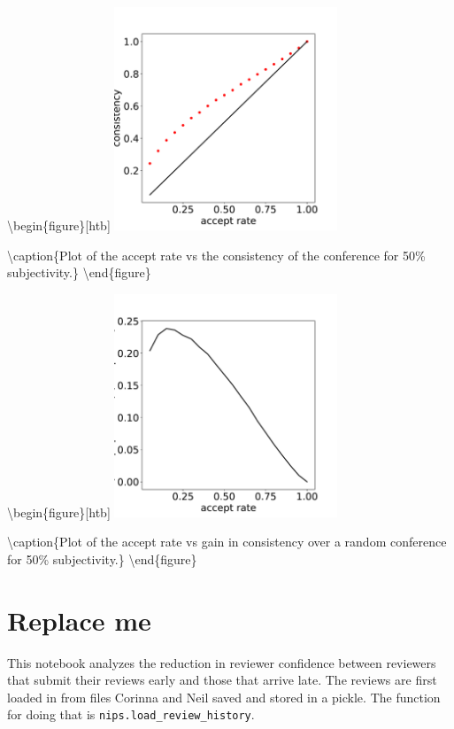 \textbackslash begin\{figure\}{[}htb{]}
\includegraphics[width=0.50\textwidth]{diagrams/neurips/consistency-vs-accept-rate.pdf}

\textbackslash caption\{Plot of the accept rate vs the consistency of
the conference for 50\% subjectivity.\}
\label{consistency-vs-accept-rate} \textbackslash end\{figure\}

\textbackslash begin\{figure\}{[}htb{]}
\includegraphics[width=0.50\textwidth]{diagrams/neurips/gain-in-consistency.pdf}

\textbackslash caption\{Plot of the accept rate vs gain in consistency
over a random conference for 50\% subjectivity.\}
\label{gain-in-consistency} \textbackslash end\{figure\}

\hypertarget{replace-me}{%
\section{Replace me}\label{replace-me}}

This notebook analyzes the reduction in reviewer confidence between
reviewers that submit their reviews early and those that arrive late.
The reviews are first loaded in from files Corinna and Neil saved and
stored in a pickle. The function for doing that is
\texttt{nips.load\_review\_history}.

